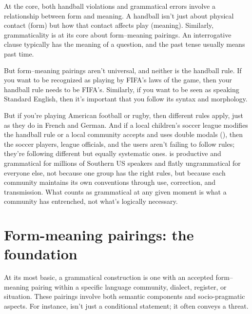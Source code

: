 At the core, both handball violations and grammatical errors involve a relationship between form and meaning. A handball isn't just about physical contact (form) but how that contact affects play (meaning). Similarly, grammaticality is at its core about form--meaning pairings. An interrogative clause typically has the meaning of a question, and the past tense usually means past time.

But form--meaning pairings aren't universal, and neither is the handball rule. If you want to be recognized as playing by FIFA's laws of the game, then your handball rule needs to be FIFA's. Similarly, if you want to be seen as speaking Standard English, then it's important that you follow its syntax and morphology.

But if you're playing American football or rugby, then different rules apply, just as they do in French and German. And if a local children's soccer league modifies the handball rule or a local community accepts and uses double modals (), then the soccer players, league officials, and the  users aren't failing to follow rules; they're following different but equally systematic ones.  is productive and grammatical for millions of Southern US speakers and flatly ungrammatical for everyone else, not because one group has the right rules, but because each community maintains its own conventions through use, correction, and transmission. What counts as grammatical at any given moment is what a community has entrenched, not what's logically necessary.

\section{Form-meaning pairings: the foundation}

At its most basic, a grammatical construction is one with an accepted form--meaning pairing within a specific language community, dialect, register, or situation. These pairings involve both semantic components and socio-pragmatic aspects. For instance,  isn't just a conditional statement; it often conveys a threat.


